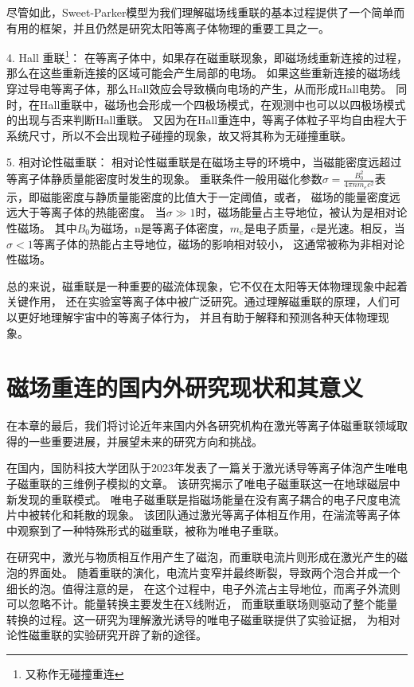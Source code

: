 尽管如此，Sweet-Parker模型为我们理解磁场线重联的基本过程提供了一个简单而有用的框架，并且仍然是研究太阳等离子体物理的重要工具之一。

4.	Hall 重联\footnote{又称作无碰撞重连}\cite{annurev:/content/journals/10.1146/annurev-astro-082708-101726, Uzdensky_2006}：
在等离子体中，如果存在磁重联现象，即磁场线重新连接的过程，那么在这些重新连接的区域可能会产生局部的电场。
如果这些重新连接的磁场线穿过导电等离子体，那么Hall效应会导致横向电场的产生，从而形成Hall电势。
同时，在Hall重联中，磁场也会形成一个四极场模式，在观测中也可以以四极场模式的出现与否来判断Hall重联。
又因为在Hall重连中，等离子体粒子平均自由程大于系统尺寸，所以不会出现粒子碰撞的现象，故又将其称为无碰撞重联。


5. 相对论性磁重联\cite{Uzdensky_2011}：	相对论性磁重联是在磁场主导的环境中，当磁能密度远超过等离子体静质量能密度时发生的现象。
重联条件一般用磁化参数$\displaystyle\sigma=\frac{B_0^2}{4\pi nm_e c^2}$表示，即磁能密度与静质量能密度的比值大于一定阈值，或者，
磁场的能量密度远远大于等离子体的热能密度。
当$\displaystyle\sigma\gg 1$时，磁场能量占主导地位，被认为是相对论性磁场。
其中$B_0$为磁场，n是等离子体密度，$m_e$是电子质量，c是光速。相反，当$\sigma<1$等离子体的热能占主导地位，磁场的影响相对较小，
这通常被称为非相对论性磁场。

总的来说，磁重联是一种重要的磁流体现象，它不仅在太阳等天体物理现象中起着关键作用，
还在实验室等离子体中被广泛研究。通过理解磁重联的原理，人们可以更好地理解宇宙中的等离子体行为，
并且有助于解释和预测各种天体物理现象。

\section[\textnormal{磁场重连的国内外研究现状和其意义}]{\textbf{磁场重连的国内外研究现状和其意义}}

在本章的最后，我们将讨论近年来国内外各研究机构在激光等离子体磁重联领域取得的一些重要进展，并展望未来的研究方向和挑战。

在国内，国防科技大学团队于2023年发表了一篇关于激光诱导等离子体泡产生唯电子磁重联的三维例子模拟\cite{https://doi.org/10.1029/2023GL104868}的文章。
该研究揭示了唯电子磁重联这一在地球磁层中新发现的重联模式。
唯电子磁重联是指磁场能量在没有离子耦合的电子尺度电流片中被转化和耗散的现象。
该团队通过激光等离子体相互作用，在湍流等离子体中观察到了一种特殊形式的磁重联，被称为唯电子重联。

在研究中，激光与物质相互作用产生了磁泡，而重联电流片则形成在激光产生的磁泡的界面处。
随着重联的演化，电流片变窄并最终断裂，导致两个泡合并成一个细长的泡。值得注意的是，
在这个过程中，电子外流占主导地位，而离子外流则可以忽略不计。能量转换主要发生在X线附近，
而重联重联场则驱动了整个能量转换的过程。这一研究为理解激光诱导的唯电子磁重联提供了实验证据，
为相对论性磁重联的实验研究开辟了新的途径。

